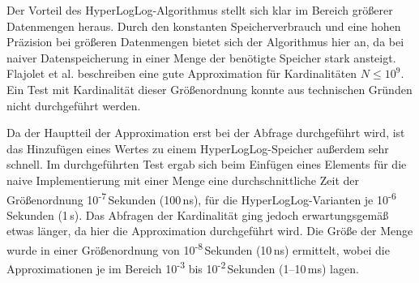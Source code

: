 Der Vorteil des HyperLogLog-Algorithmus stellt sich klar im Bereich größerer Datenmengen heraus.
Durch den konstanten Speicherverbrauch und eine hohen Präzision bei größeren Datenmengen bietet sich der Algorithmus hier an, da bei naiver Datenspeicherung in einer Menge der benötigte Speicher stark ansteigt.
Flajolet et al. \cite{flajolet2007} beschreiben eine gute Approximation für Kardinalitäten $N \le 10^9$.
Ein Test mit Kardinalität dieser Größenordnung konnte aus technischen Gründen nicht durchgeführt werden.

Da der Hauptteil der Approximation erst bei der Abfrage durchgeführt wird, ist das Hinzufügen eines Wertes zu einem HyperLogLog-Speicher außerdem sehr schnell.
Im durchgeführten Test ergab sich beim Einfügen eines Elements für die naive Implementierung mit einer Menge eine durchschnittliche Zeit der Größenordnung 10\textsuperscript{-7}\,Sekunden (100\,ns), für die HyperLogLog-Varianten je 10\textsuperscript{-6}\,Sekunden (1\,\textmu{}s).
Das Abfragen der Kardinalität ging jedoch erwartungsgemäß etwas länger, da hier die Approximation durchgeführt wird.
Die Größe der Menge wurde in einer Größenordnung von 10\textsuperscript{-8}\,Sekunden (10\,ns) ermittelt, wobei die Approximationen je im Bereich 10\textsuperscript{-3} bis 10\textsuperscript{-2}\,Sekunden (1--10\,ms) lagen.